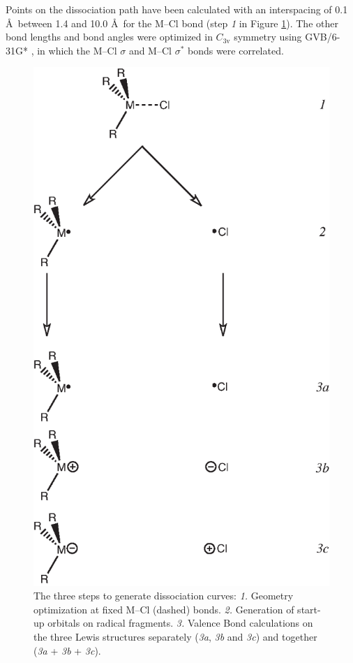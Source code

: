Points on the dissociation path have been calculated with an interspacing of 0.1 \AA\ between 1.4 and 10.0 \AA\ for the \mbox{M--Cl} bond  (step \textit{1} in Figure \ref{ch3.fig.scheme1}). The other bond lengths and bond angles were optimized in $C_\mathrm{3v}$ symmetry using \mbox{GVB/6-31G*} \cite{gvb1,gvb2,gvb3,gvb4}, in which the \mbox{M--Cl} $\sigma$ and \mbox{M--Cl} $\sigma^{*}$ bonds were correlated.
\begin{figure}[ht]
\begin{center}
\includegraphics{dissociation/figures/scheme1.eps}
\end{center}
\caption{The three steps to generate dissociation curves: \textit{1.} Geometry optimization at fixed M--Cl (dashed) bonds. \textit{2.} Generation of start-up orbitals on radical fragments. \textit{3.} Valence Bond calculations on the three Lewis structures separately (\textit{3a}, \textit{3b} and \textit{3c}) and together (\textit{3a} + \textit{3b} + \textit{3c}).} 
\label{ch3.fig.scheme1}
\end{figure}
